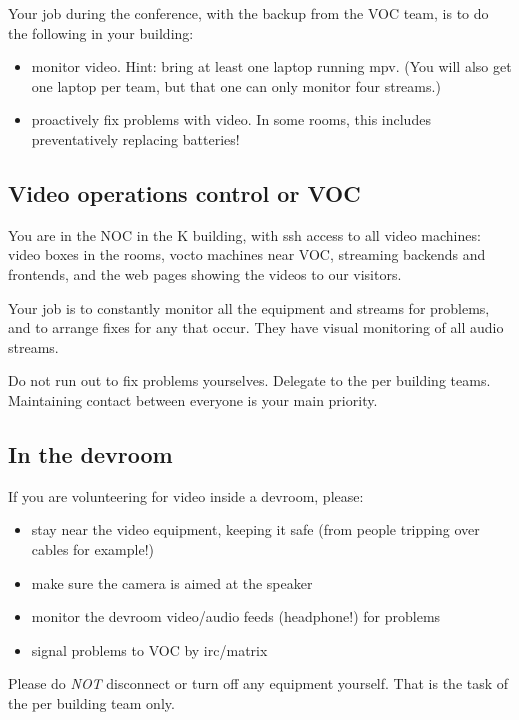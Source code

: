 \documentclass{article}
\begin{document}
Your job during the conference, with the backup from the VOC team, is to do the following in your building:
\begin{itemize}
	\item monitor video. Hint: bring at least one laptop running mpv. (You will also get one laptop per team, but that one can only monitor four streams.)
  \item proactively fix problems with video. In some rooms, this includes preventatively replacing batteries!
\end{itemize}


\subsection{Video operations control or VOC}
You are in the NOC in the K building, with ssh access to all video machines: video boxes in the rooms, vocto machines near VOC, streaming backends and frontends, and the web pages showing the videos to our visitors.

Your job is to constantly monitor all the equipment and streams for problems, and to arrange fixes for any that occur. They have visual monitoring of all audio streams.

Do not run out to fix problems yourselves. Delegate to the per building teams. Maintaining contact between everyone is your main priority.

\subsection{In the devroom}
If you are volunteering for video inside a devroom, please:
\begin{itemize}
  \item stay near the video equipment, keeping it safe (from people tripping over cables for example!)
  \item make sure the camera is aimed at the speaker
  \item monitor the devroom video/audio feeds (headphone!) for problems
  \item signal problems to VOC by irc/matrix
\end{itemize}

Please do \emph{NOT} disconnect or turn off any equipment yourself. That is the task of the per building team only.
\end{document}
